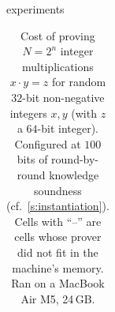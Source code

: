 \begin{lncsappendix}{experiments}
\begin{table}[H]
\begin{tabular}{@{}rlrrrrrrr@{}}
    \bottomrule
  \end{tabular}
  \caption{Cost of proving $N=2^n$ integer multiplications $x \cdot y = z$ for random $32$-bit non-negative integers $x, y$ (with $z$  a $64$-bit integer). Configured at $100$ bits of round-by-round knowledge soundness (cf.\ \cref{s:instantiation}). Cells with ``--'' are cells whose prover did not fit in the machine's memory. Ran on a MacBook Air  M5, 24\,GB. }
  \label{tab:f2z-u32-mul}
\end{table}







%




\end{lncsappendix}
